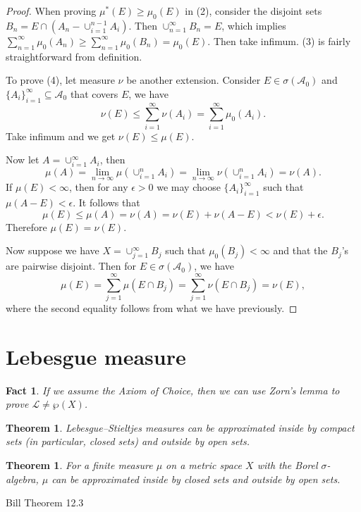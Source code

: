 \documentclass[10pt]{book}
\numberwithin{equation}{chapter}
\theoremstyle{plain-star}
\newtheorem{thm}[equation]{Theorem}
\newtheorem{fact}[equation]{Fact}
\theoremstyle{definition-star}
\theoremstyle{remark-star}
\theoremstyle{plain-star}
\newcommand{\A}{\mathcal{A}}
\begin{document}
\begin{proof}
When proving $\mu^{*}(E)\geq\mu_{0}(E)$ in (2), consider the disjoint
sets $B_{n}=E\cap(A_{n}-\cup_{i=1}^{n-1}A_{i})$. Then $\cup_{n=1}^{\infty}B_{n}=E$,
which implies $\sum_{n=1}^{\infty}\mu_{0}(A_{n})\geq\sum_{n=1}^{\infty}\mu_{0}(B_{n})=\mu_{0}(E)$.
Then take infimum. (3) is fairly straightforward from definition.

To prove (4), let measure $\nu$ be another extension. Consider $E\in\sigma(\A_{0})$
and $\{A_{i}\}_{i=1}^{\infty}\subseteq\A_{0}$ that covers $E$, we
have 
\[
\nu(E)\leq\sum_{i=1}^{\infty}\nu(A_{i})=\sum_{i=1}^{\infty}\mu_{0}(A_{i}).
\]
Take infimum and we get $\nu(E)\leq\mu(E)$.

Now let $A=\cup_{i=1}^{\infty}A_{i}$, then 
\[
\mu(A)=\lim_{n\to\infty}\mu(\cup_{i=1}^{n}A_{i})=\lim_{n\to\infty}\nu(\cup_{i=1}^{n}A_{i})=\nu(A).
\]
If $\mu(E)<\infty$, then for any $\epsilon>0$ we may choose $\{A_{i}\}_{i=1}^{\infty}$
such that $\mu(A-E)<\epsilon$. It follows that 
\[
\mu(E)\leq\mu(A)=\nu(A)=\nu(E)+\nu(A-E)<\nu(E)+\epsilon.
\]
 Therefore $\mu(E)=\nu(E)$.

Now suppose we have $X=\cup_{j=1}^{\infty}B_{j}$ such that $\mu_{0}(B_{j})<\infty$
and that the $B_{j}$'s are pairwise disjoint. Then for $E\in\sigma(\A_{0})$,
we have 
\[
\mu(E)=\sum_{j=1}^{\infty}\mu(E\cap B_{j})=\sum_{j=1}^{\infty}\nu(E\cap B_{j})=\nu(E),
\]
where the second equality follows from what we have previously.
\end{proof}

\section{Lebesgue measure}
\begin{fact}
    If we assume the Axiom of Choice, then we can use Zorn's lemma to prove $\mathcal{L} \neq \wp(X)$.
\end{fact}

\begin{thm}
    Lebesgue--Stieltjes measures can be approximated inside by compact sets (in particular, closed sets) and outside by open sets.
\end{thm}

\begin{thm}
    For a finite measure $\mu$ on a metric space $X$ with the Borel $\sigma$-algebra, $\mu$ can be approximated inside by closed sets and outside by open sets.
\end{thm}

Bill Theorem 12.3
\end{document}

